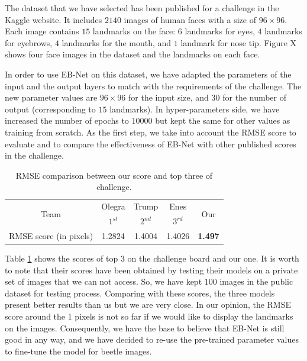 \documentclass[review]{elsarticle}
\begin{document}
The dataset that we have selected has been published for a challenge in the Kaggle website. It includes $2140$ images of human faces with a size of $96 \times 96$. Each image contains $15$ landmarks on the face: $6$ landmarks for eyes, $4$ landmarks for eyebrows, $4$ landmarks for the mouth, and $1$ landmark for nose tip. Figure X shows four face images in the dataset and the landmarks on each face.

In order to use EB-Net on this dataset, we have adapted the parameters of the input and the output layers to match with the requirements of the challenge. The new parameter values are $96 \times 96$ for the input size, and $30$ for the number of output (corresponding to $15$ landmarks). In hyper-parameters side, we have increased the number of epochs to $10000$ but kept the same for other values as training from scratch. As the first step, we take into account the RMSE score to evaluate and to compare the effectiveness of EB-Net with other published scores in the challenge.

\begin{table}[h!]
	\centering
	\begin{tabular}{ | c | c | c | c | c |}
	\hline
	\multirow{2}{*}{Team} & Olegra & Trump & Enes & \multirow{2}{*}{Our} \\
	  & $1^{st}$ & $2^{nd}$ & $3^{rd}$ &  \\ \hline
	RMSE score (in pixels) & 1.2824 & 1.4004 & 1.4026 & \textbf{1.497} \\ \hline
\end{tabular}	
	\caption{RMSE comparison between our score and top three of challenge.}
	\label{tblRMSE_challenge}
\end{table}

Table \ref{tblRMSE_challenge} shows the scores of top $3$ on the challenge board and our one. It is worth to note that their scores have been obtained by testing their models on a private set of images that we can not access. So, we have kept $100$ images in the public dataset for testing process. Comparing with these scores, the three models present better results than us but we are very close. In our opinion, the RMSE score around the 1 pixels is not so far if we would like to display the landmarks on the images. Consequently, we have the base to believe that EB-Net is still good in any way, and we have decided to re-use the pre-trained parameter values to fine-tune the model for beetle images. 
\end{document}
